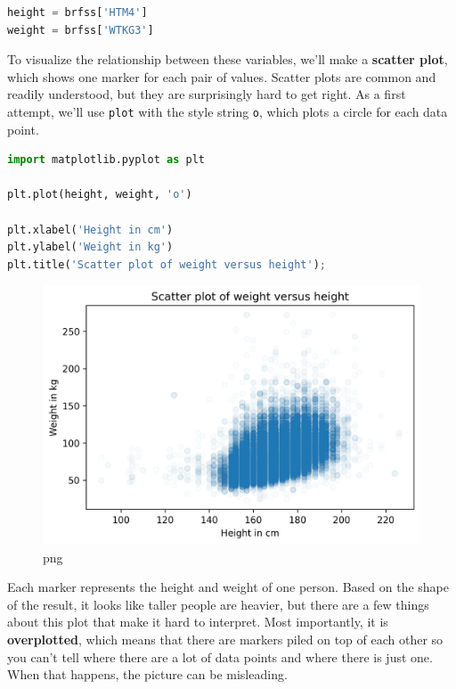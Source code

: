\documentclass[
]{book}
\newcommand{\passthrough}[1]{#1}
\begin{document}
\begin{lstlisting}[language=Python]
height = brfss['HTM4']
weight = brfss['WTKG3']
\end{lstlisting}

To visualize the relationship between these variables, we'll make a
\textbf{scatter plot}, which shows one marker for each pair of values.
Scatter plots are common and readily understood, but they are
surprisingly hard to get right. As a first attempt, we'll use
\passthrough{\lstinline!plot!} with the style string
\passthrough{\lstinline!o!}, which plots a circle for each data point.

\begin{lstlisting}[language=Python]
import matplotlib.pyplot as plt

plt.plot(height, weight, 'o')

plt.xlabel('Height in cm')
plt.ylabel('Weight in kg')
plt.title('Scatter plot of weight versus height');
\end{lstlisting}

\begin{figure}
\centering
\includegraphics{09_relationships_files/09_relationships_14_0.png}
\caption{png}
\end{figure}

Each marker represents the height and weight of one person. Based on the
shape of the result, it looks like taller people are heavier, but there
are a few things about this plot that make it hard to interpret. Most
importantly, it is \textbf{overplotted}, which means that there are
markers piled on top of each other so you can't tell where there are a
lot of data points and where there is just one. When that happens, the
picture can be misleading.
\end{document}
